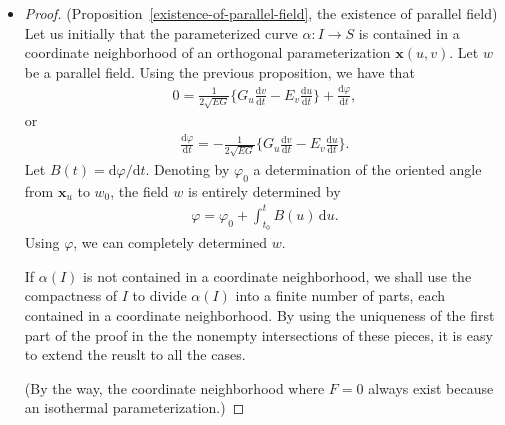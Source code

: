 \documentclass[10pt]{article}
\newcommand{\dee}{\mathrm{d}}
\newcommand{\ve}[1]{\mathbf{#1}}
\newcommand{\ra}{\rightarrow}
\begin{document}
\begin{itemize}
    \item \begin{proof} (Proposition~\ref{existence-of-parallel-field}, the existence of parallel field) Let us initially that the parameterized curve $\alpha: I \ra S$ is contained in a coordinate neighborhood of an orthogonal parameterization $\ve{x}(u,v)$. Let $w$ be a parallel field. Using the previous proposition, we have that
    \begin{align*}
      0 = \frac{1}{2\sqrt{EG}} \bigg\{ G_u \frac{\dee v}{\dee t} - E_v \frac{\dee u}{\dee t} \bigg\} + \frac{\dee \varphi}{\dee t},
    \end{align*}
    or
    \begin{align*}
      \frac{\dee \varphi}{\dee t} = -\frac{1}{2\sqrt{EG}} \bigg\{ G_u \frac{\dee v}{\dee t} - E_v \frac{\dee u}{\dee t} \bigg\}.
    \end{align*}
    Let $B(t) = \dee \varphi / \dee t$. Denoting by $\varphi_0$ a determination of the oriented angle from $\ve{x}_u$ to $w_0$, the field $w$ is entirely determined by
    \begin{align*}
      \varphi = \varphi_0 + \int_{t_0}^t B(u)\, \dee u.
    \end{align*}
    Using $\varphi$, we can completely determined $w$.

    If $\alpha(I)$ is not contained in a coordinate neighborhood, we shall use the compactness of $I$ to divide $\alpha(I)$ into a finite number of parts, each contained in a coordinate neighborhood. By using the uniqueness of the first part of the proof in the the nonempty intersections of these pieces, it is easy to extend the reuslt to all the cases.

    (By the way, the coordinate neighborhood where $F = 0$ always exist because an isothermal parameterization.)
    \end{proof}


\end{itemize}
\end{document}
